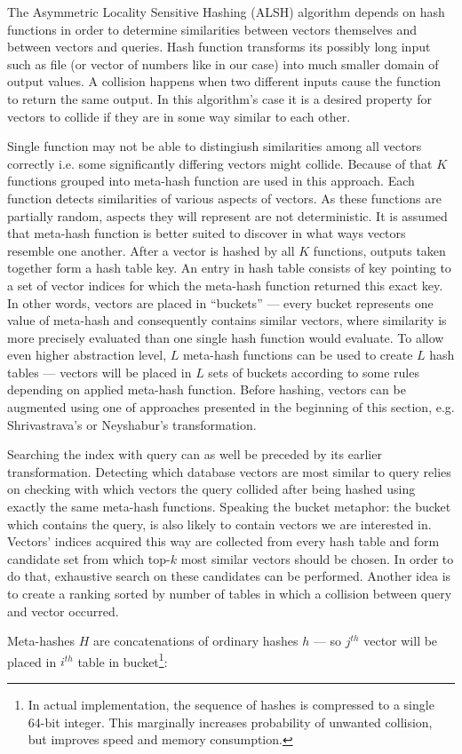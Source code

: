 The Asymmetric Locality Sensitive Hashing (ALSH) \cite{alsh} algorithm depends on hash functions
in order to determine similarities between vectors themselves and between vectors and queries.
Hash function transforms its possibly long input such as file (or vector of numbers like in our case)
into much smaller domain of output values.
A collision happens when two different inputs cause the function to return the same output.
In this algorithm's case it is a desired property for vectors to collide if they are in some way similar to each other.
\par
Single function may not be able to distingiush similarities among all vectors correctly i.e. some
significantly differing vectors might collide. Because of that $K$ functions grouped into
meta-hash function are used in this approach. Each function detects similarities of various aspects of vectors.
As these functions are partially random, aspects they will represent are not deterministic.
It is assumed that meta-hash function is better suited to discover in what ways vectors
resemble one another.
After a vector is hashed by all $K$ functions, outputs taken together form a hash table key.
An entry in hash table consists of key pointing to a set of vector indices for which the meta-hash function
returned this exact key. In other words, vectors are placed in ``buckets'' ---
every bucket represents one value of meta-hash and consequently contains similar vectors, where
similarity is more precisely evaluated than one single hash function would evaluate.
To allow even higher abstraction level, $L$ meta-hash functions can be used to create $L$ hash tables ---
vectors will be placed in $L$ sets of buckets according to some rules depending on applied meta-hash function.
Before hashing, vectors can be augmented using one of approaches presented in the beginning
of this section, e.g. Shrivastrava's or Neyshabur's transformation.
\par
Searching the index with query can as well be preceded by its earlier transformation.
Detecting which database vectors are most similar to query relies on checking with which
vectors the query collided after being hashed using exactly the same meta-hash functions.
Speaking the bucket metaphor: the bucket which contains the query, is also likely to contain
vectors we are interested in.
Vectors' indices acquired this way are collected from every hash table and form candidate set from which top-$k$
most similar vectors should be chosen. In order to do that, exhaustive search on these candidates
can be performed.
Another idea is to create a ranking sorted by number of tables in which a collision
between query and vector occurred.
\par
Meta-hashes $H$ are concatenations of ordinary hashes $h$ --- so $j^{th}$ vector will be placed in 
$i^{th}$ table in bucket\footnote{
In actual implementation, the sequence of hashes is compressed to a single 64-bit integer. This
marginally increases probability of unwanted collision, but improves speed and memory consumption.
}:

